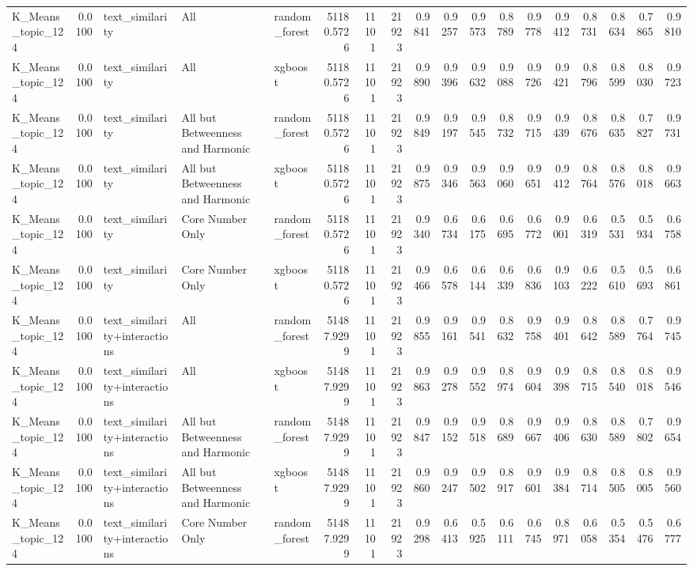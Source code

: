 \begin{tabular}{lrlllrrrrrrrrrrrrr}
K_Means_topic_124 & 0.0100 & text_similarity & All & random_forest & 51180.5726 & 11101 & 21923 & 0.9841 & 0.9257 & 0.9573 & 0.8789 & 0.9778 & 0.9412 & 0.8731 & 0.8634 & 0.7865 & 0.9810 \\
K_Means_topic_124 & 0.0100 & text_similarity & All & xgboost & 51180.5726 & 11101 & 21923 & 0.9890 & 0.9396 & 0.9632 & 0.9088 & 0.9726 & 0.9421 & 0.8796 & 0.8599 & 0.8030 & 0.9723 \\
K_Means_topic_124 & 0.0100 & text_similarity & All but Betweenness and Harmonic & random_forest & 51180.5726 & 11101 & 21923 & 0.9849 & 0.9197 & 0.9545 & 0.8732 & 0.9715 & 0.9439 & 0.8676 & 0.8635 & 0.7827 & 0.9731 \\
K_Means_topic_124 & 0.0100 & text_similarity & All but Betweenness and Harmonic & xgboost & 51180.5726 & 11101 & 21923 & 0.9875 & 0.9346 & 0.9563 & 0.9060 & 0.9651 & 0.9412 & 0.8764 & 0.8576 & 0.8018 & 0.9663 \\
K_Means_topic_124 & 0.0100 & text_similarity & Core Number Only & random_forest & 51180.5726 & 11101 & 21923 & 0.9340 & 0.6734 & 0.6175 & 0.6695 & 0.6772 & 0.9001 & 0.6319 & 0.5531 & 0.5934 & 0.6758 \\
K_Means_topic_124 & 0.0100 & text_similarity & Core Number Only & xgboost & 51180.5726 & 11101 & 21923 & 0.9466 & 0.6578 & 0.6144 & 0.6339 & 0.6836 & 0.9103 & 0.6222 & 0.5610 & 0.5693 & 0.6861 \\
K_Means_topic_124 & 0.0100 & text_similarity+interactions & All & random_forest & 51487.9299 & 11101 & 21923 & 0.9855 & 0.9161 & 0.9541 & 0.8632 & 0.9758 & 0.9401 & 0.8642 & 0.8589 & 0.7764 & 0.9745 \\
K_Means_topic_124 & 0.0100 & text_similarity+interactions & All & xgboost & 51487.9299 & 11101 & 21923 & 0.9863 & 0.9278 & 0.9552 & 0.8974 & 0.9604 & 0.9398 & 0.8715 & 0.8540 & 0.8018 & 0.9546 \\
K_Means_topic_124 & 0.0100 & text_similarity+interactions & All but Betweenness and Harmonic & random_forest & 51487.9299 & 11101 & 21923 & 0.9847 & 0.9152 & 0.9518 & 0.8689 & 0.9667 & 0.9406 & 0.8630 & 0.8589 & 0.7802 & 0.9654 \\
K_Means_topic_124 & 0.0100 & text_similarity+interactions & All but Betweenness and Harmonic & xgboost & 51487.9299 & 11101 & 21923 & 0.9860 & 0.9247 & 0.9502 & 0.8917 & 0.9601 & 0.9384 & 0.8714 & 0.8505 & 0.8005 & 0.9560 \\
K_Means_topic_124 & 0.0100 & text_similarity+interactions & Core Number Only & random_forest & 51487.9299 & 11101 & 21923 & 0.9298 & 0.6413 & 0.5925 & 0.6111 & 0.6745 & 0.8971 & 0.6058 & 0.5354 & 0.5476 & 0.6777 \\

\end{tabular}
